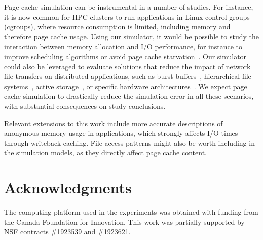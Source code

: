 \documentclass[conference]{IEEEtran}
\begin{document}
    Page cache simulation can be instrumental in a number of studies. For
    instance, it is now common for HPC clusters to run applications in
    Linux control groups (cgroups), where resource consumption is limited,
    including memory and therefore page cache usage. Using our simulator,
    it would be possible to study the interaction between memory allocation
    and I/O performance, for instance to improve scheduling algorithms or
    avoid page cache starvation~\cite{zhuang2017}. Our simulator could also
    be leveraged to evaluate solutions that reduce the impact of network
    file transfers on distributed applications, such as burst
    buffers~\cite{ferreiradasilva-fgcs-bb-2019}, hierarchical file
    systems~\cite{islam2015triple}, active storage~\cite{5496981}, or
    specific hardware architectures~\cite{hayot2020performance}. We expect
    page cache simulation to drastically reduce the simulation error in all
    these scenarios, with substantial consequences on study conclusions.

    Relevant extensions to this work include more
    accurate descriptions of anonymous memory usage in applications, 
    which strongly affects I/O times through writeback caching. File access patterns
    might also be worth including in the simulation models,
    as they directly affect page cache content.


    \section{Acknowledgments}
    The computing platform used in the experiments was obtained with funding
    from the Canada Foundation for Innovation. This work was partially supported
    by NSF contracts \#1923539 and \#1923621.



\end{document}
